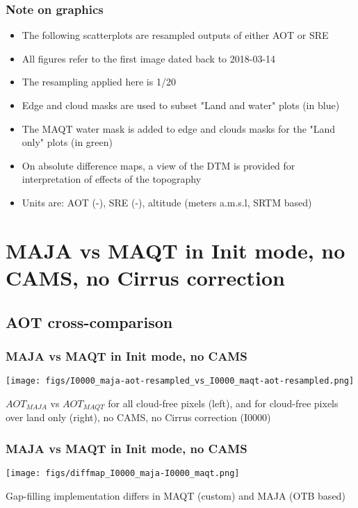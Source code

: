 \documentclass[8pt]{beamer}
\begin{document}
\begin{frame}
\frametitle{Note on graphics}
	\begin{itemize}
		\item The following scatterplots are resampled outputs of either AOT or SRE
		\item All figures refer to the first image dated back to 2018-03-14
		\item The resampling applied here is 1/20
		\item Edge and cloud masks are used to subset "Land and water" plots (in blue)
		\item The MAQT water mask is added to edge and clouds masks for the "Land only" plots (in green)
		\item On absolute difference maps, a view of the DTM is provided for interpretation of effects of the topography
		\item Units are: AOT (-), SRE (-), altitude (meters a.m.s.l, SRTM based)
	\end{itemize}
\end{frame}




\section{MAJA vs MAQT in Init mode, no CAMS, no Cirrus correction}



\subsection{AOT cross-comparison}
\begin{frame}
\frametitle{MAJA vs MAQT in Init mode, no CAMS}
	\begin{center}
		\texttt{[image: figs/I0000\_maja-aot-resampled\_vs\_I0000\_maqt-aot-resampled.png]}
	\end{center}
	
	$AOT_{MAJA}$ vs $AOT_{MAQT}$ for all cloud-free pixels (left), and for cloud-free pixels over land only (right), no CAMS, no Cirrus correction (I0000)
\end{frame}

\begin{frame}
\frametitle{MAJA vs MAQT in Init mode, no CAMS}
	\begin{center}
		\texttt{[image: figs/diffmap\_I0000\_maja-I0000\_maqt.png]}
	\end{center}
	
	Gap-filling implementation differs in MAQT (custom) and MAJA (OTB based)
\end{frame}
\end{document}
